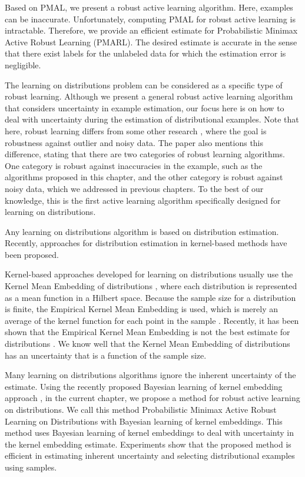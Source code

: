 	Based on PMAL, we present a robust active learning algorithm. Here, examples can be inaccurate. Unfortunately, computing PMAL for robust active learning is intractable. Therefore, we provide an efficient estimate for Probabilistic Minimax Active Robust Learning (PMARL). The desired estimate is accurate in the sense that there exist labels for the unlabeled data for which the estimation error is negligible.
	
	The learning on distributions problem can be considered as a specific type of robust learning. Although we present a general robust active learning algorithm that considers uncertainty in example estimation, our focus here is on how to deal with uncertainty during the estimation of distributional examples. Note that here, robust learning differs from some other research \cite{karimi2016statistical, xu2007regularization}, where the goal is robustness against outlier and noisy data. The paper \cite{xu2007regularization} also mentions this difference, stating that there are two categories of robust learning algorithms. One category is robust against inaccuracies in the example, such as the algorithms proposed in this chapter, and the other category is robust against noisy data, which we addressed in previous chapters. To the best of our knowledge, this is the first active learning algorithm specifically designed for learning on distributions.
	
	Any learning on distributions algorithm is based on distribution estimation. Recently, approaches for distribution estimation in kernel-based methods have been proposed.
	
	Kernel-based approaches developed for learning on distributions usually use the Kernel Mean Embedding of distributions \cite{smola2007hilbert}, where each distribution is represented as a mean function in a Hilbert space. Because the sample size for a distribution is finite, the Empirical Kernel Mean Embedding is used, which is merely an average of the kernel function for each point in the sample \cite{muandet2012domain}. Recently, it has been shown that the Empirical Kernel Mean Embedding is not the best estimate for distributions \cite{law2018gaussian}. We know well that the Kernel Mean Embedding of distributions has an uncertainty that is a function of the sample size.
	
	Many learning on distributions algorithms ignore the inherent uncertainty of the estimate. Using the recently proposed Bayesian learning of kernel embedding approach \cite{flaxman2015fast}, in the current chapter, we propose a method for robust active learning on distributions. We call this method Probabilistic Minimax Active Robust Learning on Distributions with Bayesian learning of kernel embeddings. This method uses Bayesian learning of kernel embeddings to deal with uncertainty in the kernel embedding estimate. Experiments show that the proposed method is efficient in estimating inherent uncertainty and selecting distributional examples using samples.
	

